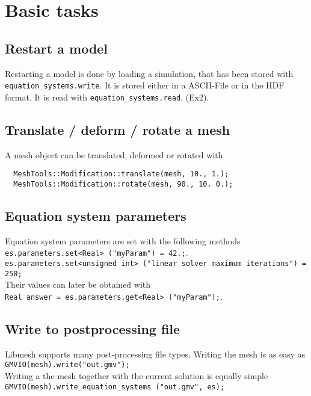 \documentclass{article}
\newcommand{\exmp}[1]{\textsf{Ex#1}}
\newcommand{\code}[1]{\texttt{#1}}
\begin{document}
\section{Basic tasks}
\label{sec:basic-tasks}

\subsection{Restart a model}
\label{sec:restart}

Restarting a model is done by loading a simulation, that has been stored with
\code{equation\_systems.write}. It is stored either in a ASCII-File or in the
HDF format. It is read with  \code{equation\_systems.read}. (\exmp{2}).

\subsection{Translate / deform / rotate a mesh}
\label{sec:translate}

A mesh object can be translated, deformed or rotated with
\begin{lstlisting}
  MeshTools::Modification::translate(mesh, 10., 1.);
  MeshTools::Modification::rotate(mesh, 90., 10. 0.);
\end{lstlisting}

\subsection{Equation system parameters}
\label{sec:EQSParameter}

Equation system parameters are set with the following methods\\[1ex]
\lstinline!es.parameters.set<Real> ("myParam") = 42.;!. \\
\lstinline!es.parameters.set<unsigned int> ("linear solver maximum iterations") = 250;! \\[1ex]
Their values can later be obtained with \\[1ex]
\lstinline!Real answer = es.parameters.get<Real> ("myParam");!. \\

\subsection{Write to postprocessing file}
\label{sec:postprocessing}

Libmesh supports many post-processing file types. Writing the mesh is as easy as\\[1ex]
\lstinline!GMVIO(mesh).write("out.gmv");!\\[1ex]
Writing a the mesh together with the current solution is equally simple\\[1ex]
\lstinline!GMVIO(mesh).write_equation_systems ("out.gmv", es);!
\end{document}
